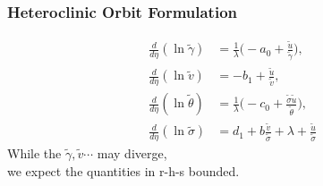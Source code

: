 \documentclass{beamer}
\def\bg{{\bar{\gamma}}}
\def\bv{{\bar{v}}}
\def\bth{{\bar{\theta}}}
\def\bs{{\bar{\sigma}}}
\def\bu{{\bar{u}}}
\def\tg{{\tilde{\gamma}}}
\def\tv{{\tilde{v}}}
\def\tth{{\tilde{\theta}}}
\def\ts{{\tilde{\sigma}}}
\def\tu{{\tilde{u}}}
\def\dtg{{\dot{\tilde{\gamma}}}}
\def\dtv{{\dot{\tilde{v}}}}
\def\dtth{{\dot{\tilde{\theta}}}}
\def\dts{{\dot{\tilde{\sigma}}}}
\begin{document}
% 

\begin{frame}
 \frametitle{Heteroclinic Orbit Formulation}
 \begin{equation}
 \label{eq:tildesys2}
\begin{aligned}
\frac{d}{d\eta}{(\ln{\tg})}  &=  \tfrac{1}{\lambda} \big (- a_0 +  \frac{\tu}{\tg} \big ),
\\
\frac{d}{d\eta}{(\ln{\tv})}  &=  - b_1 + \frac{\tu}{\tv} , 
\\
\frac{d}{d\eta}{(\ln{\tth})} &=   \tfrac{1}{\lambda} \big (- c_0 +  \frac{\ts \tu}{\tth} \big ), 
\\
\frac{d}{d\eta}{(\ln{\ts})} &= d_1 + b \frac{\tv}{\ts} + \lambda + \frac{\tu}{\ts}
\end{aligned}
\end{equation}
While the $\tg, \tv \cdots $ may diverge,\\
we expect the quantities in r-h-s bounded.
\end{frame}
\end{document}
